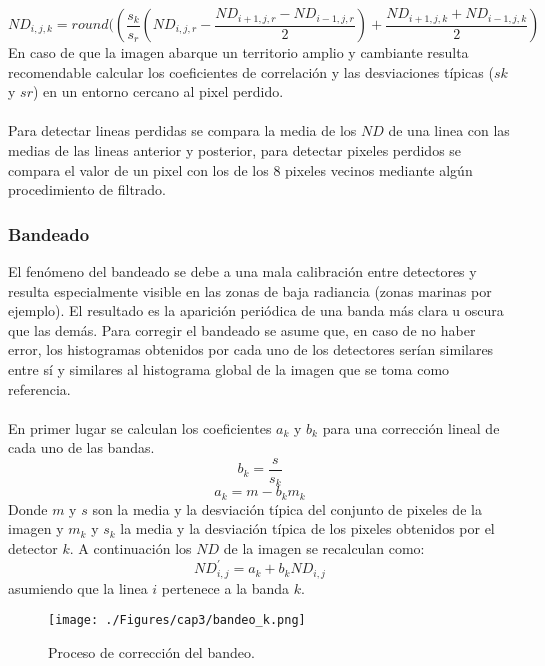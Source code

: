		\begin{equation}
		ND_{i,j,k} = round((\dfrac{s_{k}}{s_{r}}(ND_{i,j,r}-\dfrac{ND_{i+1,j,r} - ND_{i-1,j,r}}{2}) + \dfrac{ND_{i+1,j,k} + ND_{i-1,j,k}}{2})
		\end{equation} 	
En caso de que la imagen abarque un territorio amplio y cambiante resulta recomendable calcular los coeficientes de correlaci\'on y las desviaciones t\'ipicas ($ sk $ y $ sr $) en un entorno cercano al pixel perdido.\\~\\
Para detectar lineas perdidas se compara la media de los $ ND $ de una linea con las medias de las lineas anterior y posterior, para detectar pixeles perdidos se compara el valor de un pixel con los de los 8 pixeles vecinos mediante alg\'un procedimiento de filtrado.
\subsubsection{Bandeado}
El fen\'omeno del bandeado se debe a una mala calibraci\'on entre detectores y resulta especialmente visible en las zonas de baja radiancia (zonas marinas por ejemplo). El resultado es la aparici\'on peri\'odica de una banda m\'as clara u oscura que las dem\'as.
Para corregir el bandeado se asume que, en caso de no haber error, los histogramas obtenidos por cada uno de los detectores ser\'ian similares entre s\'i y similares al histograma global de la imagen que se toma como referencia.\\~\\
En primer lugar se calculan los coeficientes $ a_{k} $ y $ b_{k} $ para una correcci\'on lineal de cada uno de las bandas.
		\begin{equation}
		b_{k}=\dfrac{s}{s_{k}}
		\end{equation} 	
				\begin{equation}
				a_{k}=m - b_{k}m_{k}
				\end{equation} 	
Donde $ m $ y $ s $ son la media y la desviaci\'on t\'ipica del conjunto de pixeles de la imagen y $ m_{k} $ y $ s_{k} $ la media
y la desviaci\'on t\'ipica de los pixeles obtenidos por el detector $ k $. A continuaci\'on los $ ND $ de la imagen se recalculan como:
				\begin{equation}
				ND_{i,j}^{'} = a_{k}+b_{k}ND_{i,j}
				\end{equation} 	
asumiendo que la linea $ i $ pertenece a la banda $ k $.				

    \begin{figure}[H]
    	\centering
    	\texttt{[image: ./Figures/cap3/bandeo\_k.png]}
    	\caption{Proceso de correcci\'on del bandeo.}
    	\label{fig:bandeado}
    \end{figure}

